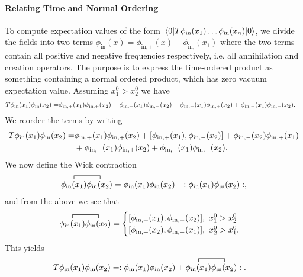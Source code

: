 \paragraph{Relating Time and Normal Ordering}
To compute expectation values of the form $\expval{\ensuremath{T}\phi_{\text{in}}(x_{1})\dots\phi_{\text{in}}(x_{n})}{0}$, we divide the fields into two terms $\phi_{\text{in}}(x) = \phi_{\text{in}, +}(x) + \phi_{\text{in}, }(x_{1})$ where the two terms contain all positive and negative frequencies respectively, i.e. all annihilation and creation operators. The purpose is to express the time-ordered product as something containing a normal ordered product, which has zero vacuum expectation value. Assuming $x_{1}^{0} > x_{2}^{0}$ we have
\begin{align*}
	T\phi_{\text{in}}(x_{1})\phi_{\text{in}}(x_{2}) =& \phi_{\text{in}, +}(x_{1})\phi_{\text{in}, +}(x_{2}) + \phi_{\text{in}, +}(x_{1})\phi_{\text{in}, -}(x_{2}) + \phi_{\text{in}, -}(x_{1})\phi_{\text{in}, +}(x_{2}) + \phi_{\text{in}, -}(x_{1})\phi_{\text{in}, -}(x_{2}).
\end{align*}
We reorder the terms by writing
\begin{align*}
	\torp\phi_{\text{in}}(x_{1})\phi_{\text{in}}(x_{2}) =& \phi_{\text{in}, +}(x_{1})\phi_{\text{in}, +}(x_{2}) + \comm{\phi_{\text{in}, +}(x_{1})}{\phi_{\text{in}, -}(x_{2})} + \phi_{\text{in}, -}(x_{2})\phi_{\text{in}, +}(x_{1}) \\
	                                                     &+ \phi_{\text{in}, -}(x_{1})\phi_{\text{in}, +}(x_{2}) + \phi_{\text{in}, -}(x_{1})\phi_{\text{in}, -}(x_{2}).
\end{align*}
We now define the Wick contraction
\begin{align*}
	\contraction{}{\phi_{\text{in}}(x_{1})}{}{\phi_{\text{in}}(x_{2})}\phi_{\text{in}}(x_{1})\phi_{\text{in}}(x_{2}) = \phi_{\text{in}}(x_{1})\phi_{\text{in}}(x_{2}) - \nop{\phi_{\text{in}}(x_{1})\phi_{\text{in}}(x_{2})},
\end{align*}
and from the above we see that
\begin{align*}
	\contraction{}{\phi_{\text{in}}(x_{1})}{}{\phi_{\text{in}}(x_{2})}\phi_{\text{in}}(x_{1})\phi_{\text{in}}(x_{2}) =
	\begin{cases}
		\comm{\phi_{\text{in}, +}(x_{1})}{\phi_{\text{in}, -}(x_{2})},\ x_{1}^{0} > x_{2}^{0} \\
		\comm{\phi_{\text{in}, +}(x_{2})}{\phi_{\text{in}, -}(x_{1})},\ x_{2}^{0} > x_{1}^{0}.
	\end{cases}
\end{align*}
This yields
\begin{align*}
	\torp\phi_{\text{in}}(x_{1})\phi_{\text{in}}(x_{2}) &= \nop{\phi_{\text{in}}(x_{1})\phi_{\text{in}}(x_{2}) + \contraction{}{\phi_{\text{in}}(x_{1})}{}{\phi_{\text{in}}(x_{2})}\phi_{\text{in}}(x_{1})\phi_{\text{in}}(x_{2})}.
\end{align*}

